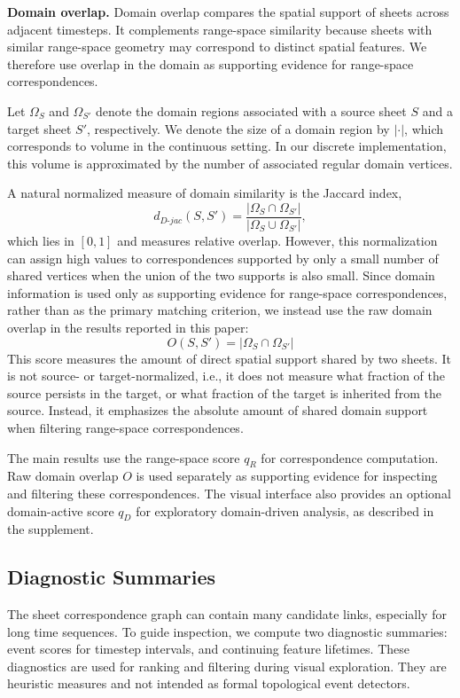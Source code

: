 \documentclass[review]{vgtc}                          %
\newcommand{\Sheet}{S}
\newcommand{\myparagraph}[1]{\vspace{1mm} \noindent \textbf{#1}}
\newcommand{\ie}{i.e.,\xspace}
\begin{document}
\myparagraph{Domain overlap.}
Domain overlap compares the spatial support of sheets across adjacent timesteps. It complements range-space similarity because sheets with similar range-space geometry may correspond to distinct spatial features. We therefore use overlap in the domain as supporting evidence for range-space correspondences.

Let $\Omega_\Sheet$ and $\Omega_{\Sheet'}$ denote the domain regions associated with a source sheet $\Sheet$ and a target sheet $\Sheet'$, respectively. We denote the size of a domain region by $|\cdot|$, which corresponds to volume in the continuous setting. In our discrete implementation, this volume is approximated by the number of associated regular domain vertices.

A natural normalized measure of domain similarity is the Jaccard index,
$$
d_{D\text{-}jac}(\Sheet,\Sheet') =
\frac{|\Omega_\Sheet \cap \Omega_{\Sheet'}|}
{|\Omega_\Sheet \cup \Omega_{\Sheet'}|},
$$
which lies in $[0,1]$ and measures relative overlap. However, this normalization can assign high values to correspondences supported by only a small number of shared vertices when the union of the two supports is also small. Since domain information is used only as supporting evidence for range-space correspondences, rather than as the primary matching criterion, we instead use the raw domain overlap in the results reported in this paper:
$$
O(\Sheet,\Sheet') = |\Omega_\Sheet \cap \Omega_{\Sheet'}|
$$
This score measures the amount of direct spatial support shared by two sheets. It is not source- or target-normalized, \ie it does not measure what fraction of the source persists in the target, or what fraction of the target is inherited from the source. Instead, it emphasizes the absolute amount of shared domain support when filtering range-space correspondences.

The main results use the range-space score $q_R$ for correspondence computation. Raw domain overlap $O$ is used separately as supporting evidence for inspecting and filtering these correspondences. The visual interface also provides an optional domain-active score $q_D$ for exploratory domain-driven analysis, as described in the supplement.




\subsection{Diagnostic Summaries}
The sheet correspondence graph can contain many candidate links, especially for long time sequences. To guide inspection, we compute two diagnostic summaries: event scores for timestep intervals, and continuing feature lifetimes. These diagnostics are used for ranking and filtering during visual exploration. They are heuristic measures and not intended as formal topological event detectors.
\end{document}
